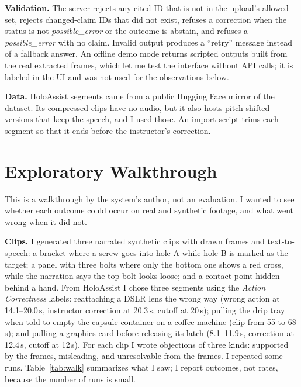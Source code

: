 \documentclass[sigconf]{acmart}
\begin{document}
\textbf{Validation.} The server rejects any cited ID that is not in the upload's allowed set, rejects changed-claim IDs that did not exist, refuses a correction when the status is not \emph{possible\_error} or the outcome is abstain, and refuses a \emph{possible\_error} with no claim. Invalid output produces a ``retry'' message instead of a fallback answer. An offline demo mode returns scripted outputs built from the real extracted frames, which let me test the interface without API calls; it is labeled in the UI and was not used for the observations below.

\textbf{Data.} HoloAssist segments came from a public Hugging Face mirror of the dataset. Its compressed clips have no audio, but it also hosts pitch-shifted versions that keep the speech, and I used those. An import script trims each segment so that it ends before the instructor's correction.

\section{Exploratory Walkthrough}

This is a walkthrough by the system's author, not an evaluation. I wanted to see whether each outcome could occur on real and synthetic footage, and what went wrong when it did not.

\textbf{Clips.} I generated three narrated synthetic clips with drawn frames and text-to-speech: a bracket where a screw goes into hole A while hole B is marked as the target; a panel with three bolts where only the bottom one shows a red cross, while the narration says the top bolt looks loose; and a contact point hidden behind a hand. From HoloAssist I chose three segments using the \emph{Action Correctness} labels: reattaching a DSLR lens the wrong way (wrong action at 14.1--20.0\,s, instructor correction at 20.3\,s, cutoff at 20\,s); pulling the drip tray when told to empty the capsule container on a coffee machine (clip from 55 to 68\,s); and pulling a graphics card before releasing its latch (8.1--11.9\,s, correction at 12.4\,s, cutoff at 12\,s). For each clip I wrote objections of three kinds: supported by the frames, misleading, and unresolvable from the frames. I repeated some runs. Table~\ref{tab:walk} summarizes what I saw; I report outcomes, not rates, because the number of runs is small.
\end{document}
